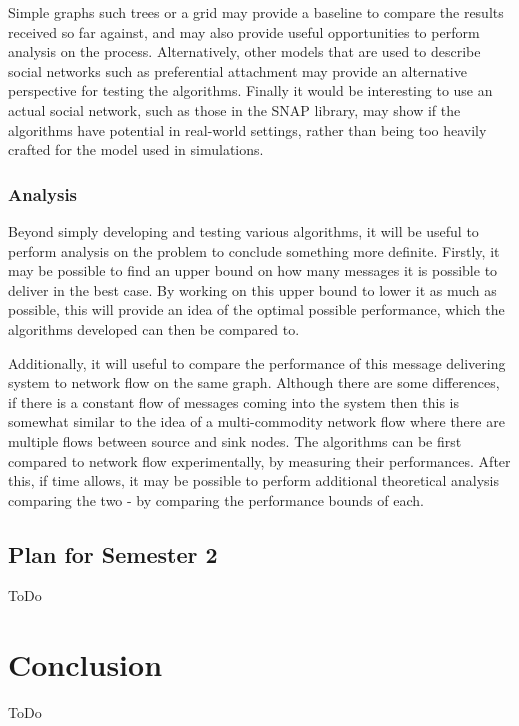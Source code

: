 \documentclass[bsc,frontabs,twoside,singlespacing,parskip,deptreport]{infthesis}     %
\begin{document}
Simple graphs such trees or a grid may provide a baseline to compare the results received so far against, and may also provide useful opportunities to perform analysis on the process. Alternatively, other models that are used to describe social networks such as preferential attachment may provide an alternative perspective for testing the algorithms. Finally it would be interesting to use an actual social network, such as those in the SNAP library\cite{snapnets}, may show if the algorithms have potential in real-world settings, rather than being too heavily crafted for the model used in simulations.

\subsection{Analysis}
Beyond simply developing and testing various algorithms, it will be useful to perform analysis on the problem to conclude something more definite. Firstly, it may be possible to find an upper bound on how many messages it is possible to deliver in the best case. By working on this upper bound to lower it as much as possible, this will provide an idea of the optimal possible performance, which the algorithms developed can then be compared to.

Additionally, it will useful to compare the performance of this message delivering system to network flow on the same graph. Although there are some differences, if there is a constant flow of messages coming into the system then this is somewhat similar to the idea of a multi-commodity network flow where there are multiple flows between source and sink nodes. The algorithms can be first compared to network flow experimentally, by measuring their performances. After this, if time allows, it may be possible to perform additional theoretical analysis comparing the two - by comparing the performance bounds of each.


\section{Plan for Semester 2}
ToDo
\chapter{Conclusion}
ToDo



\end{document}
